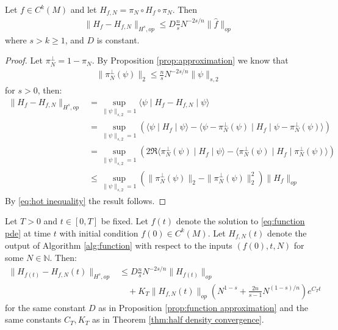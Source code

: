 \documentclass[final,leqno]{siamart}
\begin{document}
\begin{proposition} \label{prop:function approximation}
	Let $f \in C^{k}(M)$ and let $H_{f,N} = \pi_{N} \circ H_{f} \circ \pi_{N}$.  Then
	\begin{align}
		\| H_{f} - H_{f,N} \|_{H^{s},op} \leq D \frac{n}{s} N^{-2s/n} \| \hat{f} \|_{op}
	\end{align}
	where $s > k \geq 1$, and $D$ is constant.
\end{proposition}
\begin{proof}
	Let $\pi_{N}^{\perp} = 1 - \pi_{N}$.  By Proposition \ref{prop:approximation} we know that
	\begin{align}
		\| \pi_{N}^{\perp}(\psi) \|_{2} \leq \frac{n}{s} N^{-2s/n} \| \psi \|_{s,2} \label{eq:hot inequality}
	\end{align}
	for $s>0$, then:
	\begin{align*}
		\| H_{f} - H_{f,N} \|_{H^{s},op} &= \sup_{\| \psi \|_{s,2}=1} \langle \psi \mid H_{f} - H_{f,N} \mid \psi \rangle \\
			&= \sup_{\| \psi \|_{s,2}=1} \left( \langle \psi \mid H_{f}  \mid \psi \rangle - \langle \psi - \pi_{N}^{\perp}(\psi) \mid H_{f} \mid \psi - \pi_{N}^{\perp}(\psi) \rangle \right) \\
			&= \sup_{\| \psi \|_{s,2}=1} \left( 2 \Re \langle \pi_{N}^{\perp}(\psi) \mid H_{f} \mid \psi \rangle - \langle \pi_{N}^{\perp}(\psi) \mid H_{f} \mid \pi_{N}^{\perp}(\psi) \rangle \right) \\
			&\leq \sup_{\| \psi \|_{s,2}=1}  ( \| \pi_{N}^{\perp}(\psi) \|_{2}- \| \pi_{N}^{\perp}(\psi) \|_{2}^{2} ) \| H_{f} \|_{op} 
	\end{align*}
	By \eqref{eq:hot inequality} the result follows.
\end{proof}

\begin{theorem} \label{thm:function convergence}
	Let $T > 0$ and $t \in [0,T]$ be fixed.
	Let $f(t)$ denote the solution to \eqref{eq:function pde} at time $t$ with initial condition $f(0) \in C^{k}(M)$.
	Let $H_{f,N}(t)$ denote the output of Algorithm \ref{alg:function} with respect to the inputs $(f(0) , t  , N)$ for some $N \in \mathbb{N}$.
	Then:
	\begin{align}
		\| H_{f(t)} - H_{f,N}(t) \|_{H^{s},op} &\leq D \frac{n}{s} N^{-2s/n} \| H_{f(t)} \|_{op} \\
			&\quad +  K_{T} \| H_{f,N}(t) \|_{op} \left( N^{1-s} + \frac{2n}{s -1} N^{(1-s)/n} \right) e^{C_{T}t} \nonumber
	\end{align}
	for the same constant $D$ as in Proposition \ref{prop:function approximation} and the same constants $C_{T},K_{T}$ as in Theorem \ref{thm:half density convergence}.
\end{theorem}
\end{document}
